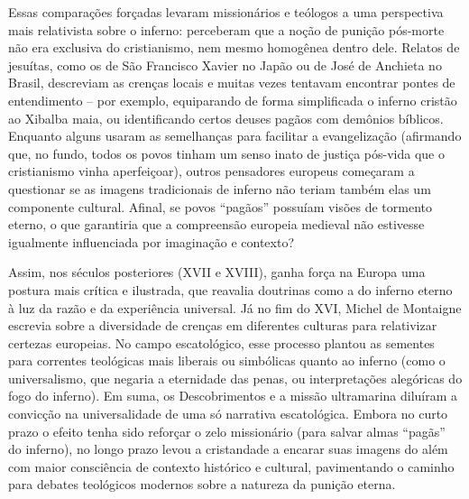 Essas comparações forçadas levaram missionários e teólogos a uma perspectiva mais relativista sobre o inferno: perceberam que a noção de punição pós-morte não era exclusiva do cristianismo, nem mesmo homogênea dentro dele. Relatos de jesuítas, como os de São Francisco Xavier no Japão ou de José de Anchieta no Brasil, descreviam as crenças locais e muitas vezes tentavam encontrar pontes de entendimento -- por exemplo, equiparando de forma simplificada o inferno cristão ao Xibalba maia, ou identificando certos deuses pagãos com demônios bíblicos. Enquanto alguns usaram as semelhanças para facilitar a evangelização (afirmando que, no fundo, todos os povos tinham um senso inato de justiça pós-vida que o cristianismo vinha aperfeiçoar), outros pensadores europeus começaram a questionar se as imagens tradicionais de inferno não teriam também elas um componente cultural. Afinal, se povos “pagãos” possuíam visões de tormento eterno, o que garantiria que a compreensão europeia medieval não estivesse igualmente influenciada por imaginação e contexto?

Assim, nos séculos posteriores (XVII e XVIII), ganha força na Europa uma postura mais crítica e ilustrada, que reavalia doutrinas como a do inferno eterno à luz da razão e da experiência universal. Já no fim do XVI, Michel de Montaigne escrevia sobre a diversidade de crenças em diferentes culturas para relativizar certezas europeias. No campo escatológico, esse processo plantou as sementes para correntes teológicas mais liberais ou simbólicas quanto ao inferno (como o universalismo, que negaria a eternidade das penas, ou interpretações alegóricas do fogo do inferno). Em suma, os Descobrimentos e a missão ultramarina diluíram a convicção na universalidade de uma só narrativa escatológica. Embora no curto prazo o efeito tenha sido reforçar o zelo missionário (para salvar almas “pagãs” do inferno), no longo prazo levou a cristandade a encarar suas imagens do além com maior consciência de contexto histórico e cultural, pavimentando o caminho para debates teológicos modernos sobre a natureza da punição eterna.

